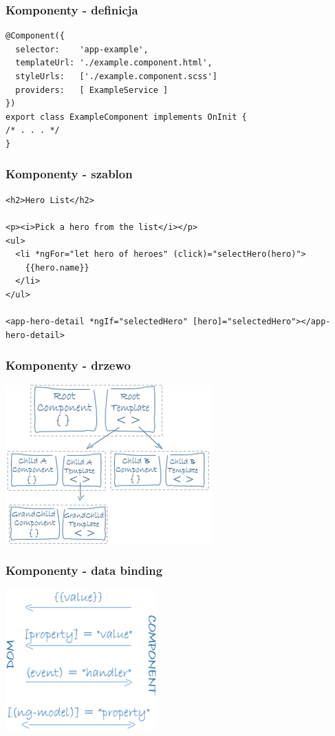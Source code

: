 \documentclass{beamer}
\begin{document}
\begin{frame}[fragile]
    \frametitle{Komponenty - definicja}
\begin{lstlisting}
@Component({
  selector:    'app-example',
  templateUrl: './example.component.html',
  styleUrls:   ['./example.component.scss']
  providers:   [ ExampleService ]
})
export class ExampleComponent implements OnInit {
/* . . . */
}
\end{lstlisting}
\end{frame}

\begin{frame}[fragile]
    \frametitle{Komponenty - szablon}
\begin{lstlisting}
<h2>Hero List</h2>

<p><i>Pick a hero from the list</i></p>
<ul>
  <li *ngFor="let hero of heroes" (click)="selectHero(hero)">
    {{hero.name}}
  </li>
</ul>

<app-hero-detail *ngIf="selectedHero" [hero]="selectedHero"></app-hero-detail>
\end{lstlisting}
\end{frame}

\begin{frame}
    \frametitle{Komponenty - drzewo}
    \begin{center}
	\includegraphics[scale=0.4]{component-tree.png}
    \end{center}
\end{frame}

\begin{frame}
    \frametitle{Komponenty - data binding}
    \begin{center}
	\includegraphics[scale=0.4]{databinding.png}
    \end{center}
\end{frame}
\end{document}
